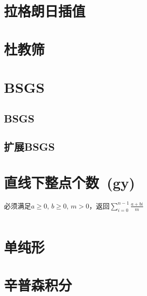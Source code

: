 \section{拉格朗日插值}
\section{杜教筛}
\section{BSGS}
\subsection{BSGS}
\subsection{扩展BSGS}
\section{直线下整点个数\ \small(gy)}
必须满足$ a \geq 0 $, $ b \geq 0 $, $ m > 0 $，返回$ \sum\limits_{i=0}^{n-1} \frac{a + bi}{m} $
\inputminted{cpp}{Math/points_below_line.cpp}
\section{单纯形}
\section{辛普森积分}
